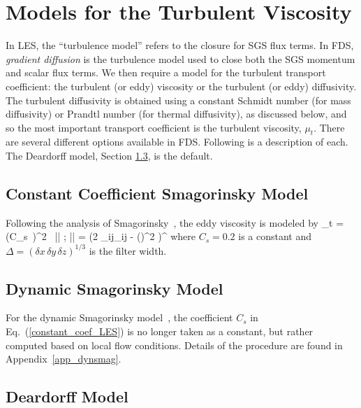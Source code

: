 \newpage

\section{Models for the Turbulent Viscosity}

In LES, the ``turbulence model'' refers to the closure for SGS flux terms.  In FDS, \emph{gradient diffusion} is the turbulence model used to close both the SGS momentum and scalar flux terms.  We then require a model for the turbulent transport coefficient: the turbulent (or eddy) viscosity or the turbulent (or eddy) diffusivity.  The turbulent diffusivity is obtained using a constant Schmidt number (for mass diffusivity) or Prandtl number (for thermal diffusivity), as discussed below, and so the most important transport coefficient is the turbulent viscosity, $\mu_t$. There are several different options available in FDS. Following is a description of each. The Deardorff model, Section \ref{sec:deardorff}, is the default.

\subsection{Constant Coefficient Smagorinsky Model}

Following the analysis of Smagorinsky~\cite{Smagorinsky:1}, the eddy viscosity is modeled by
\be
\mu_t = \overline{\rho} \, (C_s\, \Delta)^2 \, || \label{constant_coef_LES} \quad ; \quad || = \left(2 _{ij}_{ij} -  (\nabla\!\cdot \widetilde{\bu})^2 \right)^\ha
\ee
where $C_s=0.2$ is a constant and $\Delta = (\delta x \, \delta y \, \delta z)^{1/3}$ is the filter width.

\subsection{Dynamic Smagorinsky Model}

For the dynamic Smagorinsky model~\cite{Germano:1}, the coefficient $C_s$ in Eq.~(\ref{constant_coef_LES}) is no longer taken as a constant, but rather computed based on local flow conditions. Details of the procedure are found in Appendix~\ref{app_dynsmag}.

\subsection{Deardorff Model}
\label{sec:deardorff}

